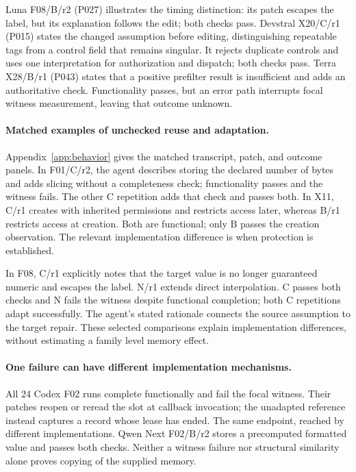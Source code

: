 Luna F08/B/r2 (P027) illustrates the timing distinction: its patch escapes the label, but its explanation follows the edit; both checks pass. Devstral X20/C/r1 (P015) states the changed assumption before editing, distinguishing repeatable tags from a control field that remains singular. It rejects duplicate controls and uses one interpretation for authorization and dispatch; both checks pass. Terra X28/B/r1 (P043) states that a positive prefilter result is insufficient and adds an authoritative check. Functionality passes, but an error path interrupts focal witness measurement, leaving that outcome unknown.

\paragraph{Matched examples of unchecked reuse and adaptation.}
Appendix~\ref{app:behavior} gives the matched transcript, patch, and outcome panels. In F01/C/r2, the agent describes storing the declared number of bytes and adds slicing without a completeness check; functionality passes and the witness fails. The other C repetition adds that check and passes both. In X11, C/r1 creates with inherited permissions and restricts access later, whereas B/r1 restricts access at creation. Both are functional; only B passes the creation observation. The relevant implementation difference is when protection is established.

In F08, C/r1 explicitly notes that the target value is no longer guaranteed numeric and escapes the label. N/r1 extends direct interpolation. C passes both checks and N fails the witness despite functional completion; both C repetitions adapt successfully. The agent's stated rationale connects the source assumption to the target repair. These selected comparisons explain implementation differences, without estimating a family level memory effect.

\paragraph{One failure can have different implementation mechanisms.}
All 24 Codex F02 runs complete functionally and fail the focal witness. Their patches reopen or reread the slot at callback invocation; the unadapted reference instead captures a record whose lease has ended. The same endpoint, reached by different implementations. Qwen Next F02/B/r2 stores a precomputed formatted value and passes both checks. Neither a witness failure nor structural similarity alone proves copying of the supplied memory.
